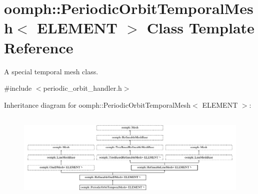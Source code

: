 \hypertarget{classoomph_1_1PeriodicOrbitTemporalMesh}{}\section{oomph\+:\+:Periodic\+Orbit\+Temporal\+Mesh$<$ E\+L\+E\+M\+E\+NT $>$ Class Template Reference}
\label{classoomph_1_1PeriodicOrbitTemporalMesh}


A special temporal mesh class.  




{\ttfamily \#include $<$periodic\+\_\+orbit\+\_\+handler.\+h$>$}

Inheritance diagram for oomph\+:\+:Periodic\+Orbit\+Temporal\+Mesh$<$ E\+L\+E\+M\+E\+NT $>$\+:\begin{figure}[H]
\begin{center}
\leavevmode
\includegraphics[height=4.312431cm]{classoomph_1_1PeriodicOrbitTemporalMesh}
\end{center}
\end{figure}

